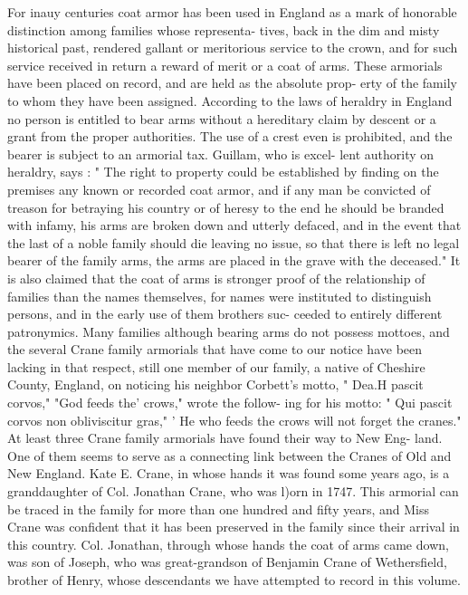 \documentclass[oneside]{book}
\begin{document}
For inauy centuries coat armor has been used in England as a 
mark of honorable distinction among families whose representa- 
tives, back in the dim and misty historical past, rendered gallant 
or meritorious service to the crown, and for such service received 
in return a reward of merit or a coat of arms. These armorials 
have been placed on record, and are held as the absolute prop- 
erty of the family to whom they have been assigned. According 
to the laws of heraldry in England no person is entitled to bear 
arms without a hereditary claim by descent or a grant from the 
proper authorities. The use of a crest even is prohibited, and 
the bearer is subject to an armorial tax. Guillam, who is excel- 
lent authority on heraldry, says : " The right to property could be 
established by finding on the premises any known or recorded 
coat armor, and if any man be convicted of treason for betraying 
his country or of heresy to the end he should be branded with 
infamy, his arms are broken down and utterly defaced, and in 
the event that the last of a noble family should die leaving no 
issue, so that there is left no legal bearer of the family arms, the 
arms are placed in the grave with the deceased." It is also 
claimed that the coat of arms is stronger proof of the relationship 
of families than the names themselves, for names were instituted 
to distinguish persons, and in the early use of them brothers suc- 
ceeded to entirely different patronymics. Many families although 
bearing arms do not possess mottoes, and the several Crane family 
armorials that have come to our notice have been lacking in that 
respect, still one member of our family, a native of Cheshire 
County, England, on noticing his neighbor Corbett's motto, 
" Dea.H pascit corvos," "God feeds the' crows," wrote the follow- 
ing for his motto: " Qui pascit corvos non obliviscitur gras," 
' He who feeds the crows will not forget the cranes." At least 
three Crane family armorials have found their way to New Eng- 
land. One of them seems to serve as a connecting link between 
the Cranes of Old and New England. Kate E. Crane, in whose 
hands it was found some years ago, is a granddaughter of Col. 
Jonathan Crane, who was l)orn in 1747. This armorial can be 
traced in the family for more than one hundred and fifty years, 
and Miss Crane was confident that it has been preserved in the 
family since their arrival in this country. Col. Jonathan, through 
whose hands the coat of arms came down, was son of Joseph, 
who was great-grandson of Benjamin Crane of Wethersfield, 
brother of Henry, whose descendants we have attempted to 
record in this volume. 
\end{document}
